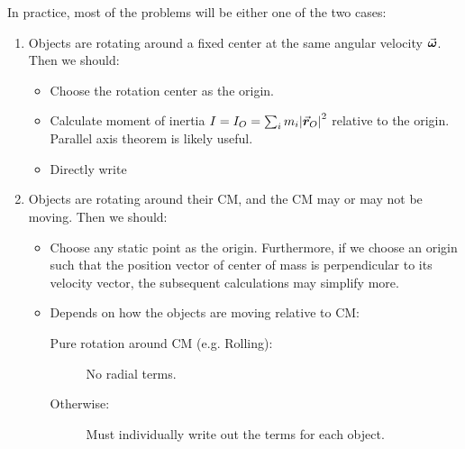 \documentclass[class=article, crop=false, 12pt]{standalone}
\begin{document}
In practice, most of the problems will be either one of the two cases:
\begin{enumerate}
    \item Objects are rotating around a fixed center at the same angular velocity $\va*{\omega}$.
    Then we should:
    \begin{itemize}
        \item Choose the rotation center as the origin.
        \item Calculate moment of inertia $I = I_O = \sum_i m_i\abs{\va*{r}_O}^2$ relative to the origin. 
        Parallel axis theorem is likely useful.
        \item Directly write 
    \end{itemize}
    \item Objects are rotating around their CM, and the CM may or may not be moving.
    Then we should:
    \begin{itemize}
        \item Choose any static point as the origin. 
        Furthermore, if we choose an origin such that the position vector of center of mass is perpendicular to its velocity vector, 
        the subsequent calculations may simplify more.
        \item Depends on how the objects are moving relative to CM:
        \begin{description}
            \item[Pure rotation around CM (e.g. Rolling):] No radial terms.            
            \item[Otherwise:] Must individually write out the terms for each object.
        \end{description}
    \end{itemize}
\end{enumerate}

\begin{center}
\end{center}
\end{document}

